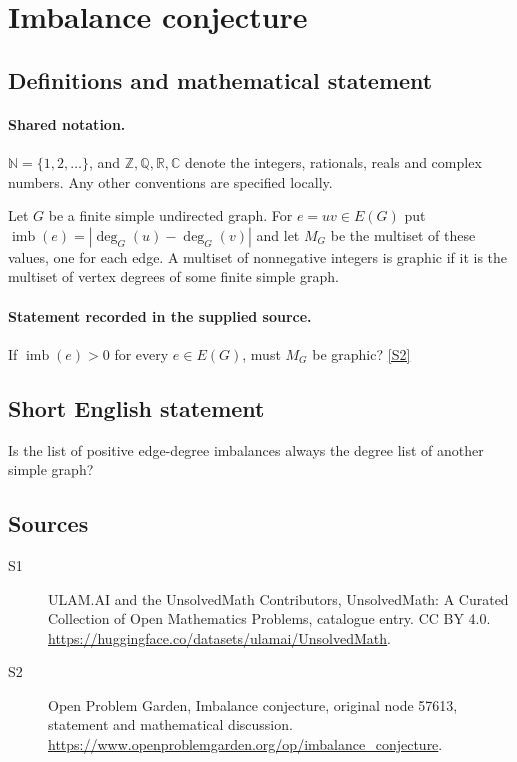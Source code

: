 \documentclass[11pt]{article}
\newcommand{\sref}[2]{\hyperlink{source:#1:#2}{[S#2]}}
\begin{document}
\section{Imbalance conjecture}\label{statement}

\subsection{Definitions and mathematical statement}

\paragraph{Shared notation.}$\mathbb N=\{1,2,\ldots\}$, and $\mathbb Z,\mathbb Q,\mathbb R,\mathbb C$ denote the integers, rationals, reals and complex numbers. Any other conventions are specified locally.


Let $G$ be a finite simple undirected graph. For $e=uv\in E(G)$ put $\operatorname{imb}(e)=|\deg_G(u)-\deg_G(v)|$ and let $M_G$ be the multiset of these values, one for each edge. A multiset of nonnegative integers is graphic if it is the multiset of vertex degrees of some finite simple graph.
\paragraph{Statement recorded in the supplied source.}
If $\operatorname{imb}(e)>0$ for every $e\in E(G)$, must $M_G$ be graphic? \sref{statement}{2}
\subsection{Short English statement}
Is the list of positive edge-degree imbalances always the degree list of another simple graph?
\subsection{Sources}
\begin{description}
\item[\hypertarget{source:statement:1}{S1}] ULAM.AI and the UnsolvedMath Contributors, UnsolvedMath: A Curated Collection of Open Mathematics Problems, catalogue entry. CC BY 4.0. \url{https://huggingface.co/datasets/ulamai/UnsolvedMath}.
\item[\hypertarget{source:statement:2}{S2}] Open Problem Garden, Imbalance conjecture, original node 57613, statement and mathematical discussion. \url{https://www.openproblemgarden.org/op/imbalance_conjecture}.
\end{description}
\label{end:statement}
\end{document}
